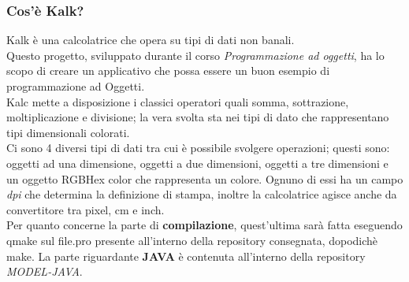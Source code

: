 \documentclass[10pt]{beamer}
\begin{document}
\begin{frame}
\frametitle{Cos'è Kalk?}
Kalk è una calcolatrice che opera su tipi di dati non banali. \\
Questo progetto, sviluppato durante il corso \textit{Programmazione ad oggetti}, ha lo scopo di creare un applicativo che possa essere un buon esempio di programmazione ad Oggetti. \\
Kalc mette a disposizione i classici operatori quali somma, sottrazione, moltiplicazione e divisione; la vera svolta sta nei tipi di dato che rappresentano tipi dimensionali colorati. \\
Ci sono 4 diversi tipi di dati tra cui è possibile svolgere operazioni; questi sono: oggetti ad una dimensione, oggetti a due dimensioni, oggetti a tre dimensioni e un oggetto RGBHex color che rappresenta un colore.
Ognuno di essi ha un campo \textit{dpi} che determina la definizione di stampa, inoltre la calcolatrice agisce anche da convertitore tra pixel, cm e inch. \\
Per quanto concerne la parte di \textbf{compilazione}, quest'ultima sarà fatta eseguendo qmake sul file.pro presente all'interno della repository consegnata, dopodichè make.
La parte riguardante \textbf{JAVA} è contenuta all'interno della repository \textit{MODEL-JAVA}.




\end{frame}

\end{document}
